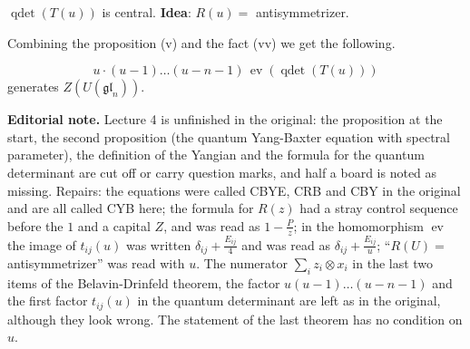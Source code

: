 \begin{proposition}[v]
\label{proposition-l4-central}
$\operatorname{qdet}(T(u))$ is central.
{\bf Idea}: $R(u)=$ antisymmetrizer.
\end{proposition}

Combining the proposition (v) and the
fact (vv) we get the following.

\begin{theorem}
\label{theorem-l4-center}
$$
u\cdot (u-1)\ldots(u-n-1)\,
\operatorname{ev}(\operatorname{qdet}(T(u)))
$$
generates $Z(U(\mathfrak{gl}_{n}))$.
\end{theorem}

\medskip\noindent
{\bf Editorial note.}
Lecture 4 is unfinished in the original:
the proposition at the start, the second
proposition (the quantum Yang-Baxter
equation with spectral parameter), the
definition of the Yangian and the formula
for the quantum determinant are cut off or
carry question marks, and half a board is
noted as missing. Repairs: the equations
were called CBYE, CRB and CBY in the
original and are all called CYB here;
the formula for $R(z)$ had a stray control
sequence before the $1$ and a capital $Z$,
and was read as $1-\frac{P}{z}$; in the
homomorphism
$\operatorname{ev}$ the image of
$t_{ij}(u)$ was written
$\delta_{ij}+\frac{E_{ij}}{4}$ and was read
as $\delta_{ij}+\frac{E_{ij}}{u}$;
``$R(U)=$ antisymmetrizer'' was read with
$u$. The numerator
$\sum_{i}z_{i}\otimes x_{i}$ in the last
two items of the Belavin-Drinfeld theorem,
the factor $u(u-1)\ldots(u-n-1)$ and the
first factor $t_{ij}(u)$ in the quantum
determinant are left as in the original,
although they look wrong. The statement of
the last theorem has no condition on
$u$.






